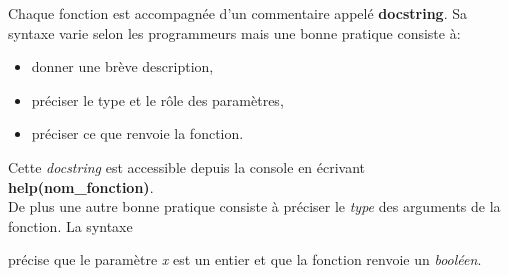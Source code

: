 \documentclass[a4paper,11pt]{article}
\begin{document}
\begin{Form}
\begin{aretenir}[Commentaires]
Chaque fonction est accompagnée d'un commentaire appelé \textbf{docstring}. Sa syntaxe varie selon les programmeurs mais une bonne pratique consiste à:
\begin{itemize}
\item donner une brève description,
\item préciser le type et le rôle des paramètres,
\item préciser ce que renvoie la fonction.
\end{itemize}
Cette \emph{docstring} est accessible depuis la console en écrivant \textbf{help(nom\_fonction)}.\\
De plus une autre bonne pratique consiste à préciser le \emph{type} des arguments de la fonction. La syntaxe

précise que le paramètre \emph{x} est un entier et que la fonction renvoie un \emph{booléen}.
\end{aretenir}
\begin{exo}

\end{exo}
\begin{exo}

\end{exo}
\begin{exo}

\end{exo}
\begin{exo}

\end{exo}
\begin{exo}

\end{exo}
\begin{exo}

\end{exo}
\begin{exo}

\end{exo}
\begin{exo}

\end{exo}
\begin{exo}

\end{exo}
\begin{exo}

\end{exo}
\begin{exo}

\end{exo}
\begin{exo}

\end{exo}
\begin{exo}

\end{exo}
\end{Form}
\end{document}

